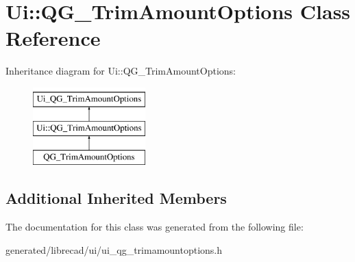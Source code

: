 \hypertarget{classUi_1_1QG__TrimAmountOptions}{\section{Ui\-:\-:Q\-G\-\_\-\-Trim\-Amount\-Options Class Reference}
\label{classUi_1_1QG__TrimAmountOptions}
}
Inheritance diagram for Ui\-:\-:Q\-G\-\_\-\-Trim\-Amount\-Options\-:\begin{figure}[H]
\begin{center}
\leavevmode
\includegraphics[height=3.000000cm]{classUi_1_1QG__TrimAmountOptions}
\end{center}
\end{figure}
\subsection*{Additional Inherited Members}


The documentation for this class was generated from the following file\-:\begin{DoxyCompactItemize}
\item 
generated/librecad/ui/ui\-\_\-qg\-\_\-trimamountoptions.\-h\end{DoxyCompactItemize}
